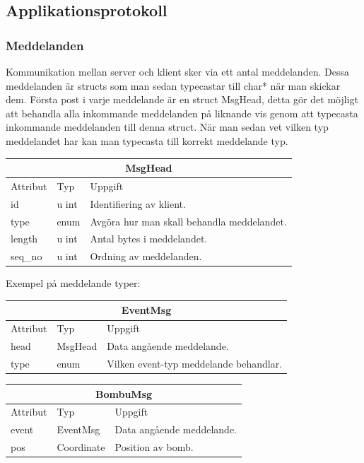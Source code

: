 \documentclass[10pt, titlepage, oneside, a4paper]{article}
\begin{document}
    	\subsection{Applikationsprotokoll}
    	\subsubsection{Meddelanden}
    		Kommunikation mellan server och klient sker via ett antal meddelanden. Dessa meddelanden är structs som man sedan typecastar till char* när man skickar dem. Första post i varje meddelande är en struct MsgHead, detta gör det möjligt att behandla alla inkommande meddelanden på liknande vis genom att typecasta inkommande meddelanden till denna struct. När man sedan vet vilken typ meddelandet har kan man typecasta till korrekt meddelande typ.
    		
    	\begin{center}
    	\begin{tabular}{| l | l | l |}
    	\hline
    	\multicolumn{3}{|c|}{MsgHead}\\
    	\hline
    	Attribut & Typ & Uppgift\\ 
    	\hline
    	id & u int & Identifiering av klient. \\
    	type & enum & Avgöra hur man skall behandla meddelandet. \\
    	length & u int & Antal bytes i meddelandet. \\
    	seq\_no & u int & Ordning av meddelanden. \\
    	\hline 
    	\end{tabular} 
    	\end{center}
    	
    	Exempel på meddelande typer:
    	
    	\begin{center}
    	\begin{tabular}{| l | l | l |}
    	\hline
    	\multicolumn{3}{|c|}{EventMsg}\\
    	\hline
    	Attribut & Typ & Uppgift\\ 
    	\hline
    	head & MsgHead & Data angående meddelande.\\
    	type & enum & Vilken event-typ meddelande behandlar.\\
    	\hline 
    	\end{tabular} 
    	\end{center}

    	\begin{center}
    	\begin{tabular}{| l | l | l |}
    	\hline
    	\multicolumn{3}{|c|}{BombuMsg}\\
    	\hline
    	Attribut & Typ & Uppgift\\ 
    	\hline
    	event & EventMsg & Data angående meddelande.\\
    	pos & Coordinate & Position av bomb.\\
    	\hline 
    	\end{tabular} 
    	\end{center}
    	
\end{document}
